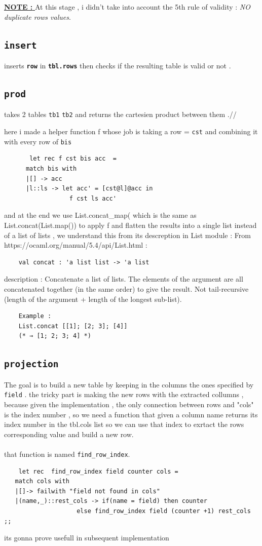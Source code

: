 \documentclass[11pt]{article}
\begin{document}
\underline{\textbf{NOTE : }} At this stage , i didn't take into account the 5th rule of validity : \textit{NO duplicate rows values}.

\subsection{\texttt{insert}}
inserts \textbf{\texttt{row}} in \textbf{\texttt{tbl.rows}} then checks if the resulting table is valid or not . 

\subsection{\texttt{prod}}
takes 2 tables \texttt{tb1} \texttt{tb2} and returns the cartesien product between them .//

here i made a helper function f whose job is taking a row = \texttt{cst} and combining it with every row of \texttt{bis}
\begin{lstlisting}
       let rec f cst bis acc  = 
      match bis with 
      |[] -> acc
      |l::ls -> let acc' = [cst@l]@acc in 
                  f cst ls acc'
\end{lstlisting}

and at the end we use List.concat\_map( which is the same as  List.concat(List.map()) to apply f and  flatten the results into a single list instead of a list of lists , we understand this from its descreption in List module : 
From https://ocaml.org/manual/5.4/api/List.html :
\begin{lstlisting}
    val concat : 'a list list -> 'a list
\end{lstlisting}
description : Concatenate a list of lists. The elements of the argument are all concatenated together (in the same order) to give the result. Not tail-recursive (length of the argument + length of the longest sub-list).
\begin{lstlisting}
    Example :
    List.concat [[1]; [2; 3]; [4]]
    (* → [1; 2; 3; 4] *)
\end{lstlisting}

\subsection{\texttt{projection}}
The goal is to build a new table by keeping in the columns the ones specified by \texttt{field} . the tricky part is making the new rows with the extracted collumns , because given the implementation , the only connection between rows and "cols" is the index number , so we need a function that given a column name returns its index number in the tbl.cols list so we can use that index to exrtact the rows corresponding value and build a new row. \\
\\
that function is named  \texttt{find\_row\_index}.
\begin{lstlisting}
    let rec  find_row_index field counter cols =
   match cols with 
   |[]-> failwith "field not found in cols"
   |(name,_)::rest_cols -> if(name = field) then counter  
                    else find_row_index field (counter +1) rest_cols
;;
\end{lstlisting}
its gonna prove usefull in subsequent implementation
\end{document}
